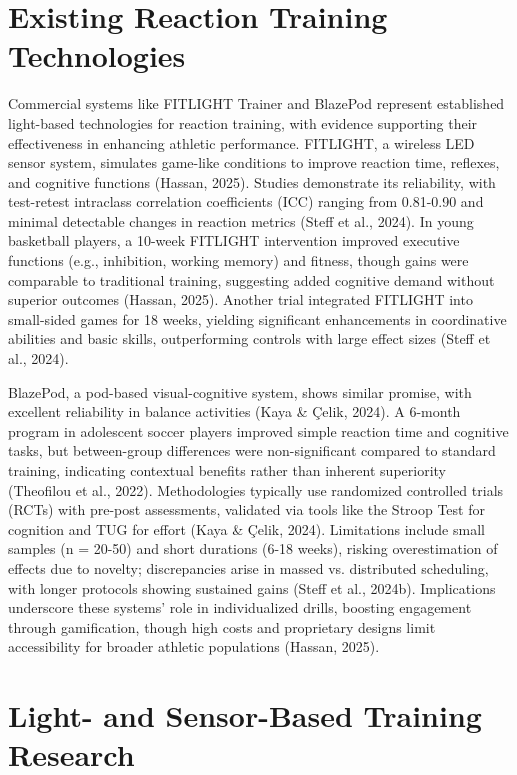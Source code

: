 \section{Existing Reaction Training Technologies}

Commercial systems like FITLIGHT Trainer and BlazePod represent established light-based technologies for reaction training, with evidence supporting their effectiveness in enhancing athletic performance. FITLIGHT, a wireless LED sensor system, simulates game-like conditions to improve reaction time, reflexes, and cognitive functions (Hassan, 2025). Studies demonstrate its reliability, with test-retest intraclass correlation coefficients (ICC) ranging from 0.81-0.90 and minimal detectable changes in reaction metrics (Steff et al., 2024). In young basketball players, a 10-week FITLIGHT intervention improved executive functions (e.g., inhibition, working memory) and fitness, though gains were comparable to traditional training, suggesting added cognitive demand without superior outcomes (Hassan, 2025). Another trial integrated FITLIGHT into small-sided games for 18 weeks, yielding significant enhancements in coordinative abilities and basic skills, outperforming controls with large effect sizes (Steff et al., 2024).

BlazePod, a pod-based visual-cognitive system, shows similar promise, with excellent reliability in balance activities (Kaya \& Çelik, 2024). A 6-month program in adolescent soccer players improved simple reaction time and cognitive tasks, but between-group differences were non-significant compared to standard training, indicating contextual benefits rather than inherent superiority (Theofilou et al., 2022). Methodologies typically use randomized controlled trials (RCTs) with pre-post assessments, validated via tools like the Stroop Test for cognition and TUG for effort (Kaya \& Çelik, 2024). Limitations include small samples (n = 20-50) and short durations (6-18 weeks), risking overestimation of effects due to novelty; discrepancies arise in massed vs. distributed scheduling, with longer protocols showing sustained gains (Steff et al., 2024b). Implications underscore these systems' role in individualized drills, boosting engagement through gamification, though high costs and proprietary designs limit accessibility for broader athletic populations (Hassan, 2025).


\section{Light- and Sensor-Based Training Research}

